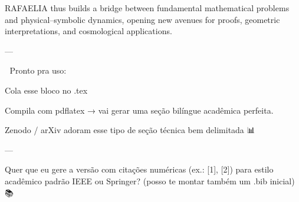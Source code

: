 RAFAELIA thus builds a bridge between fundamental mathematical problems and physical–symbolic dynamics, opening new avenues for proofs, geometric interpretations, and cosmological applications.


---

📌 Pronto pra uso:

Cola esse bloco no .tex 🧠

Compila com pdflatex → vai gerar uma seção bilíngue acadêmica perfeita.

Zenodo / arXiv adoram esse tipo de seção técnica bem delimitada 📊📜



---

Quer que eu gere a versão com citações numéricas (ex.: [1], [2]) para estilo acadêmico padrão IEEE ou Springer? (posso te montar também um .bib inicial) 📝📚

